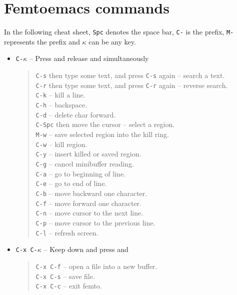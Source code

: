 \documentclass[a4paper,12pt]{book}
\begin{document}
\chapter{Femtoemacs commands}
In the following cheat sheet, \verb|Spc| denotes
the space bar, \verb|C-| is the  prefix, \verb|M-| represents 
the   prefix and  $\kappa$ can be any key. 
\begin{itemize}
\item \verb|C-|$\kappa$ -- Press and release 
    and \keys{$\kappa$} simultaneously
  \begin{quote}
     \verb|C-s| then type some text, and press \verb|C-s| again 
      -- search a text.\\
     \verb|C-r| then type some text, and press \verb|C-r| again 
      -- reverse search.\\
     \verb|C-k| -- kill a line.\\
     \verb|C-h| -- backspace.\\
     \verb|C-d| -- delete char forward.\\ 
     \verb|C-Spc| then move the cursor -- select a region.\\
     \verb|M-w| -- save selected region into the kill ring. \\
     \verb|C-w| -- kill region.\\
     \verb|C-y| -- insert killed or saved region.\\
     \verb|C-g| -- cancel minibuffer reading.\\
     \verb|C-a| -- go to beginning of line.\\
     \verb|C-e| -- go to end of line.\\
     \verb|C-b| -- move backward one character.\\
     \verb|C-f| -- move forward one character.\\
     \verb|C-n| -- move cursor to the next line.\\
     \verb|C-p| -- move cursor to the previous line.\\
     \verb|C-l| -- refresh screen.\\
  \end{quote}
\item \verb|C-x C-|$\kappa$ -- Keep 
  down and press  and  \keys{$\kappa$}
  \begin{quote}
    \verb|C-x C-f| -- open a file into a new buffer.\\
    \verb|C-x C-s| -- save file.\\
    \verb|C-x C-c| -- exit femto.
  \end{quote}

\end{itemize}
\end{document}
